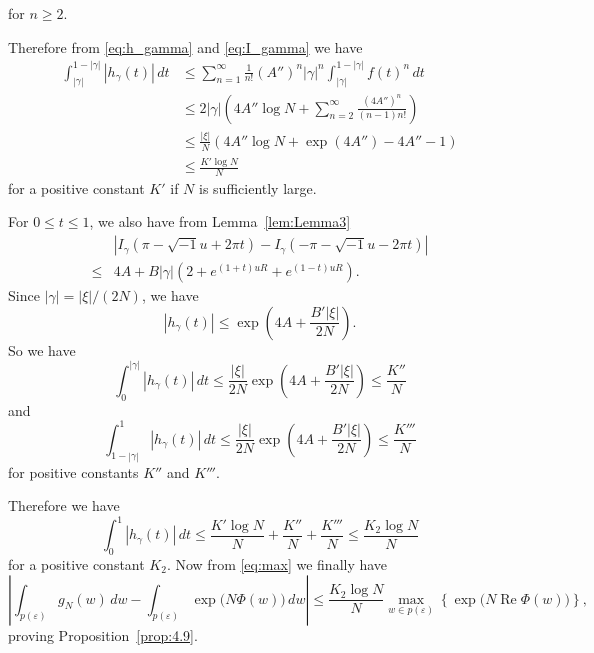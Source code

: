 \documentclass[a4paper]{amsart}
\theoremstyle{plain}
\theoremstyle{definition}
\theoremstyle{remark}
\renewcommand{\Re}{\operatorname{Re}}
\numberwithin{equation}{section}
\begin{document}
for $n\ge2$.
\par
Therefore from \eqref{eq:h_gamma} and \eqref{eq:I_gamma} we have
\begin{equation*}
\begin{split}
  \int_{|\gamma|}^{1-|\gamma|}|h_{\gamma}(t)|\,dt
  &\le
  \sum_{n=1}^{\infty}
  \frac{1}{n!}(A'')^n|\gamma|^n
  \int_{|\gamma|}^{1-|\gamma|}f(t)^n\,dt
  \\
  &\le
  2|\gamma|
  \left(
    4A''\log{N}
    +
    \sum_{n=2}^{\infty}
    \frac{(4A'')^n}{(n-1)n!}
  \right)
  \\
  &\le
  \frac{|\xi|}{N}
  \left(
    4A''\log{N}
    +
    \exp(4A'')-4A''-1
  \right)
  \\
  &\le
  \frac{K'\log{N}}{N}
\end{split}
\end{equation*}
for a positive constant $K'$ if $N$ is sufficiently large.
\par
For $0\le t\le1$, we also have from Lemma~\ref{lem:Lemma3}
\begin{equation*}
\begin{split}
  &\left|
    I_{\gamma}(\pi-\sqrt{-1}u+2\pi t)
    -
    I_{\gamma}(-\pi-\sqrt{-1}u-2\pi t)
  \right|
  \\
  \le&
  4A
  +
  B|\gamma|
  \left(
    2+e^{(1+t)uR}+e^{(1-t)uR}
  \right).
\end{split}
\end{equation*}
Since $|\gamma|=|\xi|/(2N)$, we have
\begin{equation*}
  |h_{\gamma}(t)|
  \le
  \exp
  \left(
    4A
    +
    \frac{B'|\xi|}{2N}
  \right).
\end{equation*}
So we have
\begin{equation*}
  \int_{0}^{|\gamma|}|h_{\gamma}(t)|\,dt
  \le
  \frac{|\xi|}{2N}
  \exp
  \left(
    4A
    +
    \frac{B'|\xi|}{2N}
  \right)
  \le
  \frac{K''}{N}
\end{equation*}
and
\begin{equation*}
  \int_{1-|\gamma|}^{1}|h_{\gamma}(t)|\,dt
  \le
  \frac{|\xi|}{2N}
  \exp
  \left(
    4A
    +
    \frac{B'|\xi|}{2N}
  \right)
  \le
  \frac{K'''}{N}
\end{equation*}
for positive constants $K''$ and $K'''$.
\par
Therefore we have
\begin{equation*}
  \int_{0}^{1}|h_{\gamma}(t)|\,dt
  \le
  \frac{K'\log{N}}{N}+\frac{K''}{N}+\frac{K'''}{N}
  \le
  \frac{K_2\log{N}}{N}
\end{equation*}
for a positive constant $K_2$.
Now from \eqref{eq:max} we finally have
\begin{equation*}
  \left|
    \int_{p(\varepsilon)}g_N(w)\,dw
    -
    \int_{p(\varepsilon)}\exp\bigl(N\Phi(w)\bigr)\,dw
  \right|
  \le
  \frac{K_2\log{N}}{N}
  \max_{w\in p(\varepsilon)}\left\{\exp\bigl(N\Re\Phi(w)\bigr)\right\},
\end{equation*}
proving Proposition~\ref{prop:4.9}.
\end{document}
